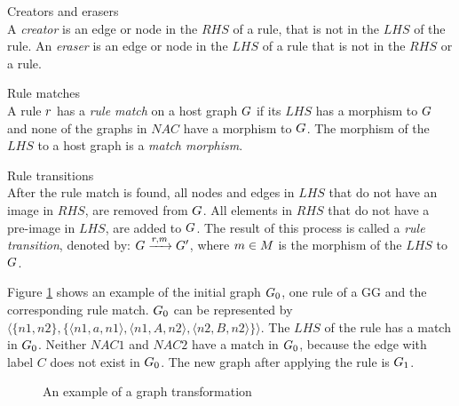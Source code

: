 \begin{definition} Creators and erasers \\
A \textit{creator} is an edge or node in the $\mathit{RHS}$ of a rule, that is not in the $\mathit{LHS}$ of the rule. An \textit{eraser} is an edge or node in the $\mathit{LHS}$ of a rule that is not in the $\mathit{RHS}$ or a rule.
\end{definition}

\vspace{10px}
\begin{definition} Rule matches \\
A rule $r$ has a \textit{rule match} on a host graph $G$ if its $\mathit{LHS}$ has a morphism to $G$ and none of the graphs in $\mathit{NAC}$ have a morphism to $G$. The morphism of the $\mathit{LHS}$ to a host graph is a \textit{match morphism}.
\end{definition}

\vspace{10px}
\begin{definition} Rule transitions \\
After the rule match is found, all nodes and edges in $\mathit{LHS}$ that do not have an image in $\mathit{RHS}$, are removed from $G$. All elements in $\mathit{RHS}$ that do not have a pre-image in $\mathit{LHS}$, are added to $G$. The result of this process is called a \textit{rule transition}, denoted by: $G \xrightarrow{r, m}G'$, where $m \in M$ is the morphism of the $\mathit{LHS}$ to $G$.
\end{definition}
\vspace{10px}

Figure \ref{fig:gg_example} shows an example of the initial graph $G_0$, one rule of a GG and the corresponding rule match. $G_0$ can be represented by $\langle\{n1,n2\},\{\langle n1,a,n1\rangle, \langle n1,A,n2\rangle,\langle n2,B,n2\rangle\}\rangle$. The $\mathit{LHS}$ of the rule has a match in $G_0$. Neither $\mathit{NAC1}$ and $\mathit{NAC2}$ have a match in $G_0$, because the edge with label $C$ does not exist in $G_0$. The new graph after applying the rule is $G_1$.

\begin{figure}[ht]
  \begin{center}
    
  \end{center}
  \caption{An example of a graph transformation}
  \label{fig:gg_example}
\end{figure}

